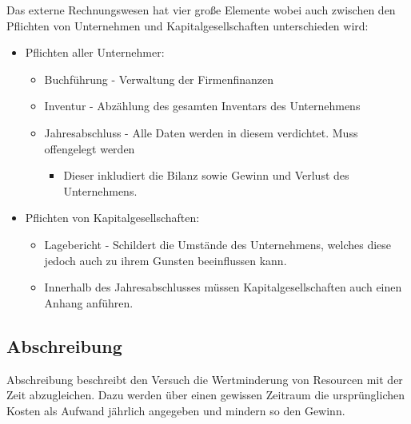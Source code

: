 \documentclass{article}
\begin{document}
	Das externe Rechnungswesen hat vier große Elemente wobei auch zwischen den Pflichten von Unternehmen und Kapitalgesellschaften unterschieden wird:
	\begin{itemize}
		\item{Pflichten aller Unternehmer:}
		\begin{itemize}
			\item{Buchführung - Verwaltung der Firmenfinanzen}
			\item{Inventur - Abzählung des gesamten Inventars des Unternehmens}
			\item{Jahresabschluss - Alle Daten werden in diesem verdichtet. Muss offengelegt werden}
			\begin{itemize}
				\item{Dieser inkludiert die Bilanz sowie Gewinn und Verlust des Unternehmens.}
			\end{itemize}
		\end{itemize}
		\item{Pflichten von Kapitalgesellschaften:}
		\begin{itemize}
			\item{Lagebericht - Schildert die Umstände des Unternehmens, welches diese jedoch auch zu ihrem Gunsten beeinflussen kann.}
			\item{Innerhalb des Jahresabschlusses müssen Kapitalgesellschaften auch einen Anhang anführen.}
		\end{itemize}
	\end{itemize}
	\subsection{Abschreibung}
	Abschreibung beschreibt den Versuch die Wertminderung von Resourcen mit der Zeit abzugleichen. Dazu werden über einen gewissen Zeitraum die ursprünglichen Kosten als Aufwand jährlich angegeben und mindern so den Gewinn.
\end{document}
